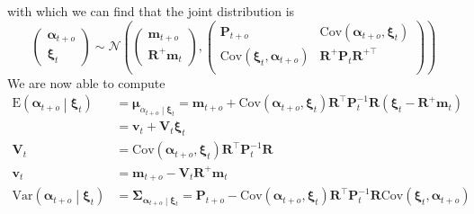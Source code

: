 \documentclass[notitlepage]{article}
\renewcommand{\vec}[1]{\bm{#1}}
\newcommand{\mat}[1]{\mathbf{#1}}
\newcommand{\Lparen}[1]{\left( #1\right)}
\newcommand{\Cond}[2]{ #1 \middle\vert  #2}
\newcommand{\VAR}{\text{Var}}
\newcommand{\E}{\text{E}}
\newcommand{\COV}{\text{Cov}}
\newcommand{\optor}[2]{#1\Lparen{#2}}
\newcommand{\optorC}[3]{\optor{#1}{\Cond{#2}{#3}}}
\newcommand{\expecC}[2]{\optorC{\E}{#1}{#2}}
\newcommand{\varpC}[2]{\optorC{\VAR}{#1}{#2}}
\newcommand{\covp}[1]{\optor{\COV}{#1}}
\newcommand\subCond[3]{#1_{\left. #2 \middle\vert #3\right.}}
\newcommand{\normal}[2]{\optor{\mathcal{N}}{#1,#2}}
\begin{document}
% 
with which we can find that the joint distribution is %
%
$$
\begin{pmatrix}
	\vec \alpha_{t + o} \\ \vec \xi_t
\end{pmatrix} \sim  \normal{%
	\begin{pmatrix} \vec m_{t+o} \\ \mat R^+\vec m_t  \end{pmatrix}}{%
	\begin{pmatrix}
		\mat P_{t + o} & \covp{\vec\alpha_{t + o}, \vec\xi_t} \\
		\covp{\vec\xi_t, \vec\alpha_{t + o}} &  \mat R^+\mat P_t \mat R^{+\top} \\
	\end{pmatrix}
}
$$%
% 
We are now able to compute %
%
\begin{align*}
\expecC{\vec \alpha_{t + o}}{\vec \xi_t} &= 
	\subCond{\vec\mu}{\alpha_{t + o}}{\vec\xi_t}
	= \vec m_{t + o} + \covp{\vec\alpha_{t + o}, \vec\xi_t}
		\mat R^\top\mat P_t^{-1} \mat R\Lparen{\vec\xi_t - \mat R^+\vec m_t} \\
	&= \vec v_t + \mat V_t\vec\xi_t \\
\mat V_t &= \covp{\vec\alpha_{t + o}, \vec\xi_t}\mat R^\top\mat P_t^{-1} \mat R \\
\vec v_t &= \vec m_{t + o} - \mat V_t\mat R^+\vec m_t \\
\varpC{\vec \alpha_{t + o}}{\vec \xi_t} &=
	\subCond{\mat\Sigma}{\vec\alpha_{t + o}}{\vec\xi_t} 
	= \mat P_{t + o} - \covp{\vec\alpha_{t + o}, \vec\xi_t}
		\mat R^\top\mat P_t^{-1} \mat R\covp{\vec\xi_t, \vec\alpha_{t + o}}
\end{align*}
\end{document}
